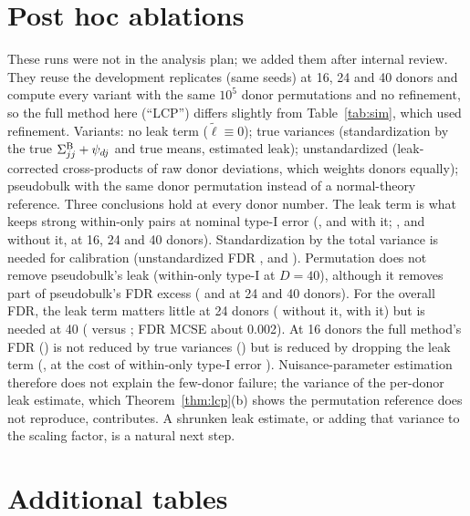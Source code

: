 \section{Post hoc ablations}\label{app:ablate}
These runs were not in the analysis plan; we added them after internal review. They reuse the development replicates (same seeds) at 16, 24 and 40 donors and compute every variant with the same $10^5$ donor permutations and no refinement, so the full method here (``LCP'') differs slightly from Table~\ref{tab:sim}, which used refinement. Variants: no leak term ($\tilde\ell\equiv0$); true variances (standardization by the true $\Sigma^{\mathrm{B}}_{jj}+\psi_{dj}$ and true means, estimated leak); unstandardized (leak-corrected cross-products of raw donor deviations, which weights donors equally); pseudobulk with the same donor permutation instead of a normal-theory reference. Three conclusions hold at every donor number. The leak term is what keeps strong within-only pairs at nominal type-I error (\ABLCPgpuSsixteen{}, \ABLCPgpuStwentyfour{} and \ABLCPgpuSforty{} with it; \ABLCPnoleakSsixteen{}, \ABLCPnoleakStwentyfour{} and \ABLCPnoleakSforty{} without it, at 16, 24 and 40 donors). Standardization by the total variance is needed for calibration (unstandardized FDR \ABLCPunstdFsixteen{}, \ABLCPunstdFtwentyfour{} and \ABLCPunstdFforty{}). Permutation does not remove pseudobulk's leak (within-only type-I \ABPBpermSforty{} at $D=40$), although it removes part of pseudobulk's FDR excess (\ABPBpermFtwentyfour{} and \ABPBpermFforty{} at 24 and 40 donors). For the overall FDR, the leak term matters little at 24 donors (\ABLCPnoleakFtwentyfour{} without it, \ABLCPgpuFtwentyfour{} with it) but is needed at 40 (\ABLCPnoleakFforty{} versus \ABLCPgpuFforty{}; FDR MCSE about 0.002). At 16 donors the full method's FDR (\ABLCPgpuFsixteen{}) is not reduced by true variances (\ABLCPtruevFsixteen{}) but is reduced by dropping the leak term (\ABLCPnoleakFsixteen{}, at the cost of within-only type-I error \ABLCPnoleakSsixteen{}). Nuisance-parameter estimation therefore does not explain the few-donor failure; the variance of the per-donor leak estimate, which Theorem~\ref{thm:lcp}(b) shows the permutation reference does not reproduce, contributes. A shrunken leak estimate, or adding that variance to the scaling factor, is a natural next step.


\section{Additional tables}


